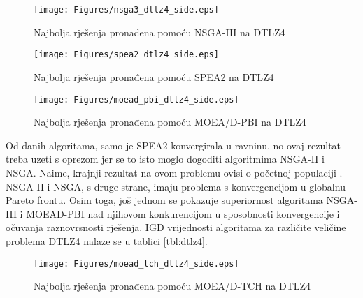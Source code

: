 \documentclass[times, utf8, zavrsni, numeric]{fer}
\begin{document}
\begin{figure}[htb]
\centering
\texttt{[image: Figures/nsga3\_dtlz4\_side.eps]}
\caption{Najbolja rješenja pronađena pomoću NSGA-III na DTLZ4}
\label{fig:nsgaiii_dtlz4}
\end{figure}

\begin{figure}[htb]
\centering
\texttt{[image: Figures/spea2\_dtlz4\_side.eps]}
\caption{Najbolja rješenja pronađena pomoću SPEA2 na DTLZ4}
\label{fig:spea2_dtlz4}
\end{figure}

\begin{figure}[htb]
\centering
\texttt{[image: Figures/moead\_pbi\_dtlz4\_side.eps]}
\caption{Najbolja rješenja pronađena pomoću MOEA/D-PBI na DTLZ4}
\label{fig:moeadpbi_dtlz4}
\end{figure}

Od danih algoritama, samo je SPEA2 konvergirala u ravninu, no ovaj rezultat treba uzeti s oprezom jer se to isto moglo dogoditi algoritmima NSGA-II i NSGA. Naime, krajnji rezultat na ovom problemu ovisi o početnoj populaciji \citep{dtlz}. NSGA-II i NSGA, s druge strane, imaju problema s konvergencijom u globalnu Pareto frontu. Osim toga, još jednom se pokazuje superiornost algoritama NSGA-III i MOEAD-PBI nad njihovom konkurencijom u sposobnosti konvergencije i očuvanja raznovrsnosti rješenja. IGD vrijednosti algoritama za različite veličine problema DTLZ4 nalaze se u tablici \ref{tbl:dtlz4}.

\FloatBarrier
\begin{figure}[htb]
\centering
\texttt{[image: Figures/moead\_tch\_dtlz4\_side.eps]}
\caption{Najbolja rješenja pronađena pomoću MOEA/D-TCH na DTLZ4}
\label{fig:moeadtch_dtlz4}
\end{figure} 
\end{document}
